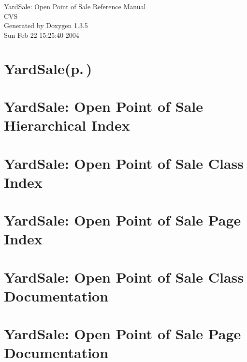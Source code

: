 \documentclass[a4paper]{book}
\begin{document}
\begin{titlepage}
\vspace*{7cm}
\begin{center}
{\Large Yard\-Sale: Open Point of Sale Reference Manual\\[1ex]\large CVS }\\
\vspace*{1cm}
{\large Generated by Doxygen 1.3.5}\\
\vspace*{0.5cm}
{\small Sun Feb 22 15:25:40 2004}\\
\end{center}
\end{titlepage}
\clearemptydoublepage
{}
\tableofcontents
\clearemptydoublepage
{}
\chapter{{\bf Yard\-Sale}{\rm (p.\,\pageref{classYardSale})} }
\label{index}
\chapter{Yard\-Sale: Open Point of Sale Hierarchical Index}

\chapter{Yard\-Sale: Open Point of Sale Class Index}

\chapter{Yard\-Sale: Open Point of Sale Page Index}

\chapter{Yard\-Sale: Open Point of Sale Class Documentation}











\chapter{Yard\-Sale: Open Point of Sale Page Documentation}


\printindex
\end{document}
